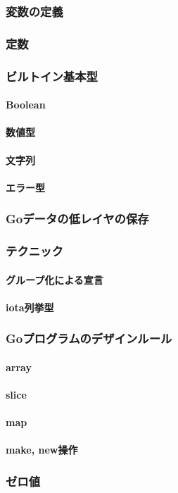 
\subsubsection{変数の定義}

\subsubsection{定数}

\subsubsection{ビルトイン基本型}
\paragraph{Boolean}

\paragraph{数値型}

\paragraph{文字列}

\paragraph{エラー型}

\subsubsection{Goデータの低レイヤの保存}

\subsubsection{テクニック}
\paragraph{グループ化による宣言}

\paragraph{iota列挙型}

\subsubsection{Goプログラムのデザインルール}

\paragraph{array}

\paragraph{slice}

\paragraph{map}

\paragraph{make, new操作}

\subsubsection{ゼロ値}

